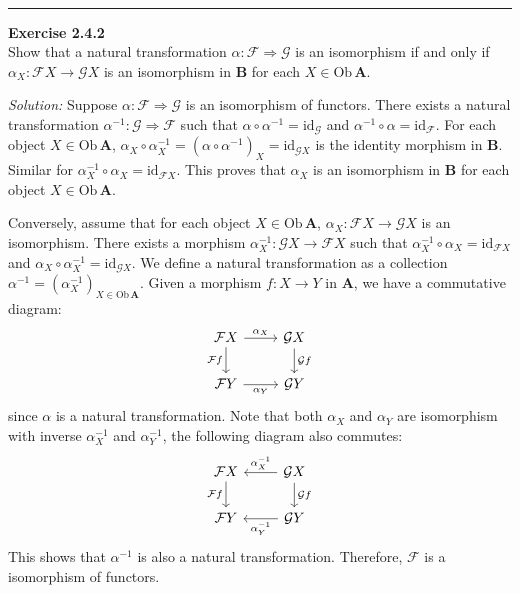 \documentclass[a4paper, 12pt]{article}
\newenvironment{problem}[2][Exercise]
    { \begin{mdframed}[backgroundcolor=gray!20] \textbf{#1 #2} \\}
    {  \end{mdframed}}
\newenvironment{solution}
    {\textit{Solution:}}
    {}
\begin{document}
\\ 
\noindent\rule{7in}{2.8pt}
\begin{problem}{2.4.2}
Show that a natural transformation \(\alpha:\mathcal{F}\Rightarrow \mathcal{G}\) is an isomorphism if and only if \(\alpha_X:\mathcal{F}X\rightarrow \mathcal{G}X\) is 
an isomorphism in \(\mathbf{B}\) for each \(X\in \text{Ob}\, \mathbf{A}\).
\end{problem}
\begin{solution}
Suppose \(\alpha:\mathcal{F}\Rightarrow \mathcal{G}\) is an isomorphism of functors. There exists a natural transformation \(\alpha^{-1}:\mathcal{G}\Rightarrow \mathcal{F}\) such that 
\(\alpha\circ \alpha^{-1}=\text{id}_{\mathcal{G}}\) and \(\alpha^{-1}\circ \alpha=\text{id}_{\mathcal{F}}\). For each object \(X\in \text{Ob}\, \mathbf{A}\), \(\alpha_X\circ \alpha^{-1}_X=(\alpha\circ \alpha^{-1})_X=\text{id}_{\mathcal{G}X}\) is the 
identity morphism in \(\mathbf{B}\). Similar for \(\alpha^{-1}_X\circ \alpha_X=\text{id}_{\mathcal{F}X}\). This proves that \(\alpha_X\) is an isomorphism in \(\mathbf{B}\) for each object \(X\in \text{Ob}\, \mathbf{A}\). 
\par 
Conversely, assume that for each object \(X\in \text{Ob}\, \mathbf{A}\), \(\alpha_X:\mathcal{F}X\rightarrow \mathcal{G}X\) is an isomorphism. There exists a morphism \(\alpha^{-1}_X:\mathcal{G}X\rightarrow \mathcal{F}X\) such that 
\(\alpha^{-1}_X\circ \alpha_X=\text{id}_{\mathcal{F}X}\) and \(\alpha_X\circ \alpha^{-1}_X=\text{id}_{\mathcal{G}X}\). We define a natural transformation as a collection 
\(\alpha^{-1}=(\alpha^{-1}_X)_{X\in \text{Ob}\, \mathbf{A}}\). Given a morphism \(f:X\rightarrow Y\) in \(\mathbf{A}\), we have a commutative diagram: 
$$\begin{tikzcd}
	{\mathcal{F}X} & {\mathcal{G}X} \\
	{\mathcal{F}Y} & {\mathcal{G}Y}
	\arrow["{\alpha_X}", from=1-1, to=1-2]
	\arrow["{\mathcal{F}f}"', from=1-1, to=2-1]
	\arrow["{\mathcal{G}f}", from=1-2, to=2-2]
	\arrow["{\alpha_Y}"', from=2-1, to=2-2]
\end{tikzcd}$$
since \(\alpha\) is a natural transformation. Note that both \(\alpha_X\) and \(\alpha_Y\) are isomorphism with inverse \(\alpha^{-1}_X\) and \(\alpha_Y^{-1}\), the following diagram also commutes: 
$$\begin{tikzcd}
	{\mathcal{F}X} & {\mathcal{G}X} \\
	{\mathcal{F}Y} & {\mathcal{G}Y}
	\arrow["{\mathcal{F}f}"', from=1-1, to=2-1]
	\arrow["{\alpha^{-1}_X}"', from=1-2, to=1-1]
	\arrow["{\mathcal{G}f}", from=1-2, to=2-2]
	\arrow["{\alpha_Y^{-1}}", from=2-2, to=2-1]
\end{tikzcd}$$
This shows that \(\alpha^{-1}\) is also a natural transformation. Therefore, \(\mathcal{F}\) is a isomorphism of functors.
\end{solution}
\end{document}
